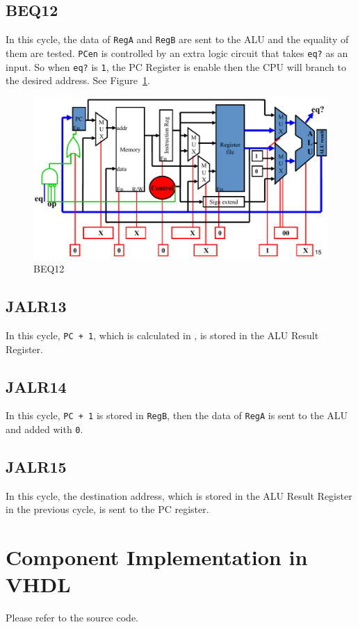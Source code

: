 \documentclass[a4paper]{article}
\begin{document}
\subsection{BEQ12}
In this cycle, the data of \verb|RegA| and \verb|RegB| are sent to the ALU and the equality of them are tested. \verb|PCen| is
controlled by an extra logic circuit that takes \verb|eq?| as an input. So when \verb|eq?| is \verb|1|, the PC Register is enable
then the CPU will branch to the desired address. See Figure~\ref{fig:beq12}.
\begin{figure}[ht!]
    \center
    \includegraphics[scale=0.4]{beq12}
    \caption{BEQ12}\label{fig:beq12}
\end{figure}

\subsection{JALR13}
In this cycle, \verb|PC + 1|, which is calculated in , is stored in the ALU Result Register.

\subsection{JALR14}
In this cycle, \verb|PC + 1| is stored in \verb|RegB|, then the data of \verb|RegA| is sent to the ALU and added with \verb|0|.

\subsection{JALR15}
In this cycle, the destination address, which is stored in the ALU Result Register in the previous cycle, is sent
to the PC register.

\section{Component Implementation in VHDL}
Please refer to the source code.
\end{document}
